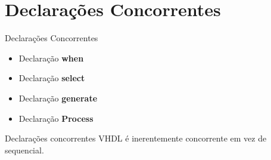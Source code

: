 \documentclass[aspectratio=169]{beamer}
\begin{document}
\section{Declarações Concorrentes}
\begin{frame}{Declarações Concorrentes}
	\justifying
	
	\begin{itemize}
		\item Declaração \textbf{when}
		\item Declaração \textbf{select}
		\item Declaração \textbf{generate}
		\item Declaração \textbf{Process}
	\end{itemize}
	
	
	\begin{block}{Declarações concorrentes}
	VHDL é inerentemente concorrente em vez de sequencial.	
		
	\end{block}
	
	
	
\end{frame}
\end{document}
